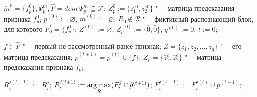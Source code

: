 	\Require $\tilde m^0=\{f_p^0\}, \Psi_p^m, \hat F=dom\ \Psi_p^m\subseteq \mathcal F$;
	\algrule
	\State $Z_p^0 := \{\bar z_1^{c0},\bar z_2^{e0}\}$ "--- матрица предсказания признака $f_p^0$;
	\State $\tilde p^{(0)} := \varnothing$, $\tilde m^{(0)} := \varnothing$;
	\State $R_0\not\in\mathcal R$ "--- фиктивный распознающий блок, для которого $F_0^*=\{f_p^0\}$;
	\State $Z^{(0)} := \varnothing$, $Z_p^{(0)} := \{\bar 0, \bar 0\}$;
	\State $q^{(0)} := 0$, $t := 0$;
	
		\State $f\in\hat F$ "--- первый не рассмотренный ранее признак; 
		\State $Z=\{\bar z_1,\bar z_2,\dots,\bar z_q\}$ "--- его матрица предсказания;
		\label{alst:find_m}
			\State $\tilde p^{(t+1)}=\tilde p^{(t)}\cup\{f\}$;
			\State $Z_p=\{\bar z_1^{c},\bar z_2^{e}\}$ "--- матрица предсказания признака $f_p$;
	
				\State $R_i^{j(t+1)}:=R_i^j$;
			\Else
				\State $R_i^{j(t+1)}:=\operatorname*{arg\,max}\limits_{\mathcal R} (F_i^j\cap\tilde p^{(t+1)})$;
				\State $F_i^{j(t+1)}:=F_i^{j(t)}\cup\tilde p^{(t+1)}$;
			\EndIf
